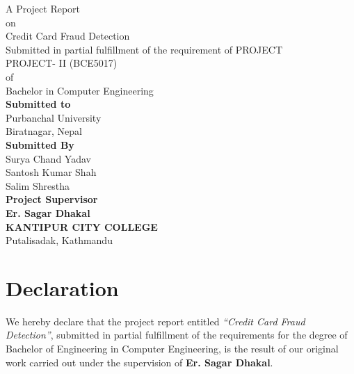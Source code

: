 \documentclass[12pt,a4paper]{report}
\newcommand{\projecttitle}{Credit Card Fraud Detection}
\newcommand{\supervisor}{Er. Sagar Dhakal}
\newcommand{\college}{Kantipur City College}
\newcommand{\collegeaddress}{Putalisadak, Kathmandu}
\begin{document}
\begin{titlepage}
  \thispagestyle{empty}
  \singlespacing
  \centering
  \vspace*{1.1cm}

  {\Large A Project Report}\\[0.65cm]
  {\Large on}\\[0.65cm]
  {\LARGE Credit Card Fraud Detection}\\[1.05cm]

  {\Large Submitted in partial fulfillment of the requirement of PROJECT}\\[0.55cm]
  {\Large PROJECT- II (BCE5017)}\\[0.55cm]
  {\Large of}\\[0.55cm]
  {\Large Bachelor in Computer Engineering}\\[1.45cm]

  {\Large \textbf{Submitted to}}\\[0.55cm]
  {\Large Purbanchal University}\\[0.45cm]
  {\Large Biratnagar, Nepal}\\[1.30cm]

  {\Large \textbf{Submitted By}}\\[0.55cm]
  {\Large Surya Chand Yadav}\\[0.35cm]
  {\Large Santosh Kumar Shah}\\[0.35cm]
  {\Large Salim Shrestha}\\[1.20cm]

  {\Large \textbf{Project Supervisor}}\\[0.45cm]
  {\Large \textbf{\supervisor}}\\[1.40cm]

  {\Large \textbf{\MakeUppercase{\college}}}\\[0.35cm]
  {\Large \collegeaddress}
\end{titlepage}

\hypersetup{pageanchor=true}
\setcounter{page}{2}
\onehalfspacing

\chapter*{Declaration}

We hereby declare that the project report entitled \textit{``\projecttitle''}, submitted in partial fulfillment of the requirements for the degree of Bachelor of Engineering in Computer Engineering, is the result of our original work carried out under the supervision of \textbf{\supervisor}.
\end{document}
